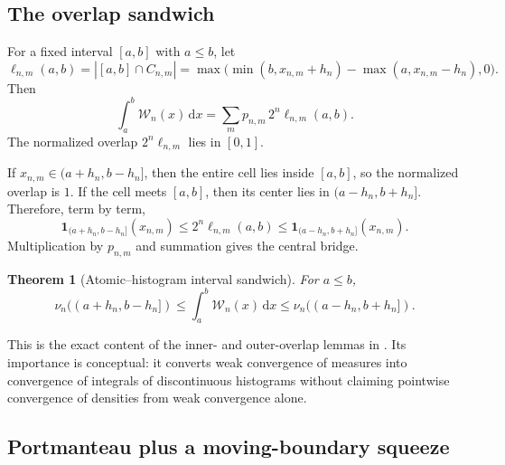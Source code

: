 \documentclass[11pt,oneside]{article}
\newtheorem{theorem}{Theorem}[section]
\theoremstyle{definition}
\theoremstyle{remark}
\newcommand{\dd}{\,\mathrm d}
\newcommand{\Wcal}{\mathcal W}
\begin{document}
\subsection{The overlap sandwich}

For a fixed interval $[a,b]$ with $a\le b$, let
\begin{equation}
 \ell_{n,m}(a,b)=|[a,b]\cap C_{n,m}|
 =\max\bigl(\min(b,x_{n,m}+h_n)-\max(a,x_{n,m}-h_n),0\bigr).
 \label{eq:cell-overlap-length}
\end{equation}
Then
\begin{equation}
 \int_a^b\Wcal_n(x)\dd x
 =\sum_m p_{n,m}\,2^n\ell_{n,m}(a,b).
 \label{eq:histogram-overlap-sum}
\end{equation}
The normalized overlap $2^n\ell_{n,m}$ lies in $[0,1]$.

If $x_{n,m}\in(a+h_n,b-h_n]$, then the entire cell lies inside $[a,b]$, so the normalized
overlap is $1$.  If the cell meets $[a,b]$, then its center lies in
$(a-h_n,b+h_n]$.  Therefore, term by term,
\begin{equation}
 \mathbf1_{(a+h_n,b-h_n]}(x_{n,m})
 \le2^n\ell_{n,m}(a,b)
 \le\mathbf1_{(a-h_n,b+h_n]}(x_{n,m}).
 \label{eq:overlap-indicator-sandwich}
\end{equation}
Multiplication by $p_{n,m}$ and summation gives the central bridge.

\begin{theorem}[Atomic--histogram interval sandwich]
\label{thm:atomic-histogram-sandwich}
For $a\le b$,
\begin{equation}
 \nu_n((a+h_n,b-h_n])
 \le\int_a^b\Wcal_n(x)\dd x
 \le\nu_n((a-h_n,b+h_n]).
 \label{eq:atomic-histogram-sandwich}
\end{equation}
\end{theorem}

This is the exact content of the inner- and outer-overlap lemmas in
.  Its importance is conceptual: it converts weak convergence
of measures into convergence of integrals of discontinuous histograms without claiming
pointwise convergence of densities from weak convergence alone.

\subsection{Portmanteau plus a moving-boundary squeeze}
\end{document}

